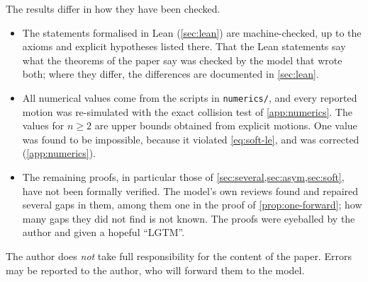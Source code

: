 The results differ in how they have been checked.
\begin{itemize}[nosep]
\item The statements formalised in Lean (\cref{sec:lean}) are machine-checked, up to the axioms and explicit hypotheses listed there.
That the Lean statements say what the theorems of the paper say was checked by the model that wrote both; where they differ, the differences are documented in \cref{sec:lean}.
\item All numerical values come from the scripts in \texttt{numerics/}, and every reported motion was re-simulated with the exact collision test of \cref{app:numerics}.
The values for $n\ge2$ are upper bounds obtained from explicit motions.
One value was found to be impossible, because it violated \eqref{eq:soft-le}, and was corrected (\cref{app:numerics}).
\item The remaining proofs, in particular those of \cref{sec:several,sec:asym,sec:soft}, have not been formally verified.
The model's own reviews found and repaired several gaps in them, among them one in the proof of \cref{prop:one-forward}; how many gaps they did not find is not known.
The proofs were eyeballed by the author and given a hopeful ``LGTM''.
\end{itemize}
The author does \emph{not} take full responsibility for the content of the paper.
Errors may be reported to the author, who will forward them to the model.

